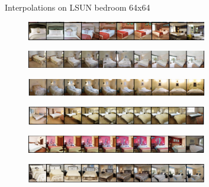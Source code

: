 \documentclass[10pt, handout]{beamer}
\begin{document}
\begin{frame}{Interpolations on LSUN bedroom 64x64}
\begin{figure}
    \centering
    \includegraphics[width=0.7\textwidth]{images/interpolations-1}
\end{figure}
\begin{figure}
    \centering
    \includegraphics[width=0.7\textwidth]{images/interpolations-2}
\end{figure}
\begin{figure}
    \centering
    \includegraphics[width=0.7\textwidth]{images/interpolations-3}
\end{figure}
\begin{figure}
    \centering
    \includegraphics[width=0.7\textwidth]{images/interpolations-4}
\end{figure}
\begin{figure}
    \centering
    \includegraphics[width=0.7\textwidth]{images/interpolations-5}
\end{figure}
\begin{figure}
    \centering
    \includegraphics[width=0.7\textwidth]{images/interpolations-6}
\end{figure}
\end{frame}
\end{document}
